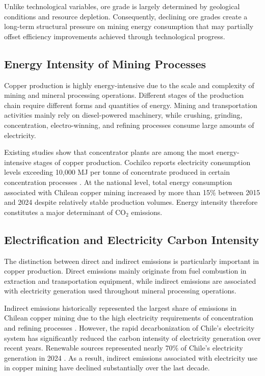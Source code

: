 Unlike technological variables, ore grade is largely determined by geological conditions and resource depletion. Consequently, declining ore grades create a long-term structural pressure on mining energy consumption that may partially offset efficiency improvements achieved through technological progress.


\subsection{Energy Intensity of Mining Processes}

Copper production is highly energy-intensive due to the scale and complexity of mining and mineral processing operations. Different stages of the production chain require different forms and quantities of energy. Mining and transportation activities mainly rely on diesel-powered machinery, while crushing, grinding, concentration, electro-winning, and refining processes consume large amounts of electricity.

Existing studies show that concentrator plants are among the most energy-intensive stages of copper production. Cochilco reports electricity consumption levels exceeding 10,000 MJ per tonne of concentrate produced in certain concentration processes \cite{Cochilco2024}. At the national level, total energy consumption associated with Chilean copper mining increased by more than 15\% between 2015 and 2024 despite relatively stable production volumes. Energy intensity therefore constitutes a major determinant of CO$_2$ emissions.


\subsection{Electrification and Electricity Carbon Intensity}
\label{sec:elec and CI}
The distinction between direct and indirect emissions is particularly important in copper production. Direct emissions mainly originate from fuel combustion in extraction and transportation equipment, while indirect emissions are associated with electricity generation used throughout mineral processing operations.

Indirect emissions historically represented the largest share of emissions in Chilean copper mining due to the high electricity requirements of concentration and refining processes \cite{CochilcoEmissions2024}. However, the rapid decarbonization of Chile’s electricity system has significantly reduced the carbon intensity of electricity generation over recent years. Renewable sources represented nearly 70\% of Chile’s electricity generation in 2024 \cite{EnergiaEstrategica2025}. As a result, indirect emissions associated with electricity use in copper mining have declined substantially over the last decade.

